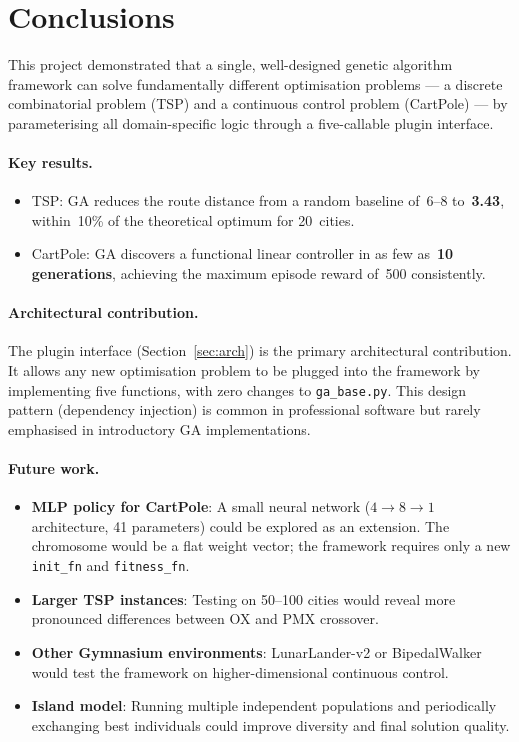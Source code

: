 \documentclass[12pt,a4paper]{article}
\begin{document}
\section{Conclusions}
\label{sec:conclusions}

This project demonstrated that a single, well-designed genetic algorithm framework can solve fundamentally different optimisation problems — a discrete combinatorial problem (TSP) and a continuous control problem (CartPole) — by parameterising all domain-specific logic through a five-callable plugin interface.

\paragraph{Key results.}
\begin{itemize}
    \item TSP: GA reduces the route distance from a random baseline of~6--8 to~\textbf{3.43}, within~10\% of the theoretical optimum for 20~cities.
    \item CartPole: GA discovers a functional linear controller in as few as~\textbf{10 generations}, achieving the maximum episode reward of~500 consistently.
\end{itemize}

\paragraph{Architectural contribution.}
The plugin interface (Section~\ref{sec:arch}) is the primary architectural contribution. It allows any new optimisation problem to be plugged into the framework by implementing five functions, with zero changes to \texttt{ga\_base.py}. This design pattern (dependency injection) is common in professional software but rarely emphasised in introductory GA implementations.

\paragraph{Future work.}
\begin{itemize}
    \item \textbf{MLP policy for CartPole}: A small neural network ($4 \to 8 \to 1$ architecture, 41 parameters) could be explored as an extension. The chromosome would be a flat weight vector; the framework requires only a new \texttt{init\_fn} and \texttt{fitness\_fn}.
    \item \textbf{Larger TSP instances}: Testing on 50--100 cities would reveal more pronounced differences between OX and PMX crossover.
    \item \textbf{Other Gymnasium environments}: LunarLander-v2 or BipedalWalker would test the framework on higher-dimensional continuous control.
    \item \textbf{Island model}: Running multiple independent populations and periodically exchanging best individuals could improve diversity and final solution quality.
\end{itemize}
\end{document}

